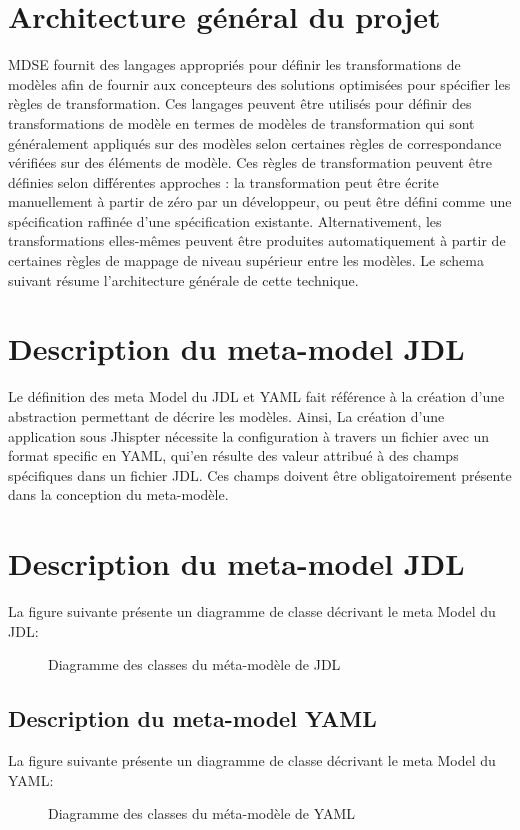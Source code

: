 \section{Architecture général du projet}

MDSE fournit des langages appropriés pour définir les transformations de
modèles afin de fournir aux concepteurs des solutions optimisées pour
spécifier les règles de transformation. Ces langages peuvent être
utilisés pour définir des transformations de modèle en termes de modèles
de transformation qui sont généralement appliqués sur des modèles selon
certaines règles de correspondance vérifiées sur des éléments de modèle.
Ces règles de transformation peuvent être définies selon différentes
approches : la transformation peut être écrite manuellement à partir de
zéro par un développeur, ou peut être défini comme une spécification
raffinée d'une spécification existante. Alternativement, les
transformations elles-mêmes peuvent être produites automatiquement à
partir de certaines règles de mappage de niveau supérieur entre les
modèles. Le schema suivant résume l'architecture générale de cette
technique.

\section{Description du meta-model JDL}

Le définition des meta Model du JDL et YAML fait référence à la création
d'une abstraction permettant de décrire les modèles. Ainsi, La création
d'une application sous Jhispter nécessite la configuration à 
travers un fichier avec un format specific en YAML, qui'en résulte
des valeur attribué à des champs spécifiques dans un fichier JDL. 
Ces champs doivent être obligatoirement présente dans la conception
du meta-modèle.

\section{Description du meta-model JDL}

La figure suivante présente un diagramme de classe décrivant 
le meta Model du JDL:

\begin{figure}[H]
  \begin{center}
      \caption{Diagramme des classes du méta-modèle de JDL}
  \end{center}
\end{figure}

\subsection{Description du meta-model YAML}

La figure suivante présente un diagramme de classe décrivant 
le meta Model du YAML:

\begin{figure}[H]
  \begin{center}
      \caption{Diagramme des classes du méta-modèle de YAML}
  \end{center}
\end{figure}